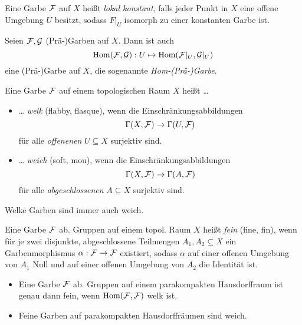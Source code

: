 \documentclass{cheat-sheet}
\begin{document}
\begin{defn}
  Eine Garbe $\mathcal{F}$ auf $X$ heißt \emph{lokal konstant}, falls jeder Punkt in $X$ eine offene Umgebung $U$ besitzt, sodass $F|_U$ isomorph zu einer konstanten Garbe ist.
\end{defn}

\begin{defn}
  Seien $\mathcal{F}, \mathcal{G}$ (Prä-)Garben auf $X$. Dann ist auch
  \[ \operatorname{Hom}(\mathcal{F}, \mathcal{G}) : U \mapsto \operatorname{Hom}(\mathcal{F}|_U, \mathcal{G}|_U) \]
  eine (Prä-)Garbe auf $X$, die sogenannte \emph{Hom-(Prä-)Garbe}.
\end{defn}

\begin{defn}
   Eine Garbe $\mathcal{F}$ auf einem topologischen Raum $X$ heißt \ldots{}
  \begin{itemize}
    \item \ldots{} \emph{welk} (flabby, flasque), wenn die Einschränkungsabbildungen
    \[ \Gamma(X, \mathcal{F}) \to \Gamma(U, \mathcal{F}) \]
    für alle {\em offenenen} $U \subseteq X$ surjektiv sind.
    \item \ldots{} \emph{weich} (soft, mou), wenn die Einschränkungsabbildungen
    \[ \Gamma(X, \mathcal{F}) \to \Gamma(A, \mathcal{F}) \]
    für alle {\em abgeschlossenen} $A \subseteq X$ surjektiv sind.
  \end{itemize}
\end{defn}

\begin{lem}
  Welke Garben sind immer auch weich.
\end{lem}

\begin{defn}
   Eine Garbe $\mathcal{F}$ ab. Gruppen auf einem topol. Raum $X$ heißt \emph{fein} (fine, fin), wenn für je zwei disjunkte, abgeschlossene Teilmengen $A_1, A_2 \subseteq X$ ein Garbenmorphismus $\alpha : \mathcal{F} \to \mathcal{F}$ existiert, sodass $\alpha$ auf einer offenen Umgebung von $A_1$ Null und auf einer offenen Umgebung von $A_2$ die Identität ist.
\end{defn}

\begin{lem}
  \begin{itemize}
    \item Eine Garbe $\mathcal{F}$ ab. Gruppen auf einem parakompakten Hausdorffraum ist genau dann fein, wenn $\operatorname{Hom}(\mathcal{F}, \mathcal{F})$ welk ist.
    \item Feine Garben auf parakompakten Hausdorffräumen sind weich.
  \end{itemize}
\end{lem}
\end{document}
